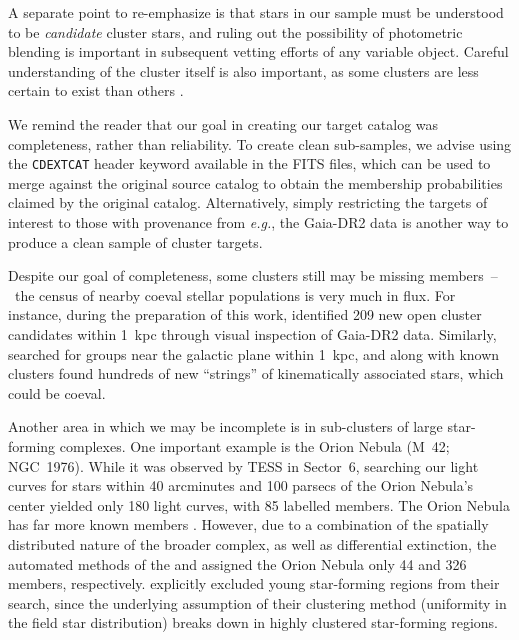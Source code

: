 \documentclass[12pt,twocolumn,tighten]{aastex62}
\begin{document}
A separate point to re-emphasize is that stars in our sample must be
understood to be {\it candidate} cluster stars, and ruling out the
possibility of photometric blending is important in subsequent vetting
efforts of any variable object.  Careful understanding of the cluster
itself is also important, as some clusters are less certain to exist
than others \citep[{\it e.g.}, the infrared clusters identified
by][]{froebrich_FSR_2007}.

We remind the reader that our goal in creating our target catalog was
completeness, rather than reliability.  To create clean sub-samples,
we advise using the \texttt{CDEXTCAT} header keyword available in the
FITS files, which can be used to merge against the original source
catalog to obtain the membership probabilities claimed by the original
catalog.  Alternatively, simply restricting the targets of interest to
those with provenance from {\it e.g.}, the Gaia-DR2 data is another
way to produce a clean sample of cluster targets.

Despite our goal of completeness, some clusters still may be missing
members~--~the census of nearby coeval stellar populations is
very much in flux. For instance, during the preparation of this work,
\citet{sim_open_2019} identified 209 new open cluster candidates
within 1~kpc through visual inspection of Gaia-DR2 data.  Similarly,
\citet{kounkel_untangling_2019} searched for groups near the galactic
plane within 1~kpc, and along with known clusters found hundreds
of new ``strings'' of kinematically associated stars, which could be
coeval.

Another area in which we may be incomplete is in sub-clusters of
large star-forming complexes. One important example is the Orion
Nebula (M~42; NGC~1976).  While it was observed by TESS in Sector~6,
searching our light curves for stars within 40 arcminutes and 100
parsecs of the Orion Nebula's center yielded only 180 light curves,
with 85 labelled members.  The Orion Nebula has far more known members
\citep{jones_proper_1988}.  However, due to a combination of the
spatially distributed nature of the broader complex, as well as
differential extinction, the automated methods of the
\citet{Kharchenko_et_al_2013} and \citet{dias_proper_2014} assigned
the Orion Nebula only 44 and 326 members, respectively.
\citet{cantat-gaudin_gaia_2018} explicitly excluded young star-forming
regions from their search, since the underlying assumption of their
clustering method (uniformity in the field star distribution) breaks
down in highly clustered star-forming regions.
\end{document}
